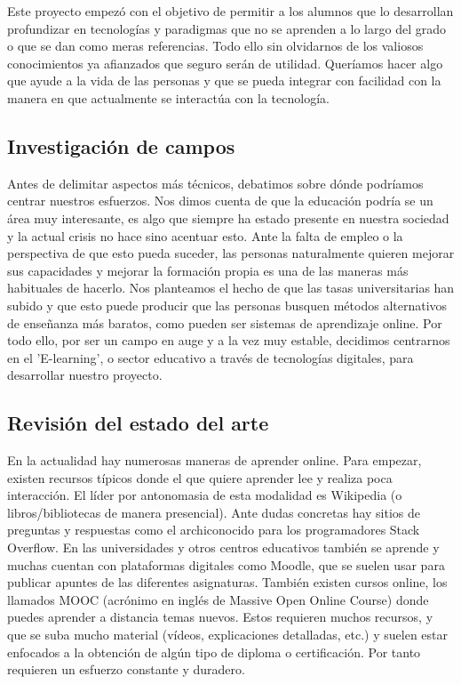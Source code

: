 
Este proyecto empezó con el objetivo de permitir a los alumnos que lo desarrollan profundizar en tecnologías y paradigmas que no se aprenden a lo largo del grado o que se dan como meras referencias. Todo ello sin olvidarnos de los valiosos conocimientos ya afianzados que seguro serán de utilidad. Queríamos hacer algo que ayude a la vida de las personas y que se pueda integrar con facilidad con la manera en que actualmente se interactúa con la tecnología.

\subsection{Investigación de campos\label{subsec:introduction}}

Antes de delimitar aspectos más técnicos, debatimos sobre dónde podríamos centrar nuestros esfuerzos. Nos dimos cuenta de que la educación podría se un área muy interesante, es algo que siempre ha estado presente en nuestra sociedad y la actual crisis no hace sino acentuar esto. Ante la falta de empleo o la perspectiva de que esto pueda suceder, las personas naturalmente quieren mejorar sus capacidades y mejorar la formación propia es una de las maneras más habituales de hacerlo. Nos planteamos el hecho de que las tasas universitarias han subido y que esto puede producir que las personas busquen métodos alternativos de enseñanza más baratos, como pueden ser sistemas de aprendizaje online. Por todo ello, por ser un campo en auge y a la vez muy estable, decidimos centrarnos en el 'E-learning', o sector educativo a través de tecnologías digitales, para desarrollar nuestro proyecto.

\subsection{Revisión del estado del arte\label{subsec:introduction}}

En la actualidad hay numerosas maneras de aprender online. Para empezar, existen recursos típicos donde el que quiere aprender lee y realiza poca interacción. El líder por antonomasia de esta modalidad es Wikipedia\cite{wiki} (o libros/bibliotecas de manera presencial). Ante dudas concretas hay sitios de preguntas y respuestas como el archiconocido para los programadores Stack Overflow\cite{stack}. En las universidades y otros centros educativos también se aprende y  muchas cuentan con plataformas digitales como Moodle\cite{moodle}, que se suelen usar para publicar apuntes de las diferentes asignaturas. También existen cursos online, los llamados MOOC (acrónimo en inglés de Massive Open Online Course) donde puedes aprender a distancia temas nuevos. Estos requieren muchos recursos, y que se suba mucho material (vídeos, explicaciones detalladas, etc.) y suelen estar enfocados a la obtención de algún tipo de diploma o certificación. Por tanto requieren un esfuerzo constante y duradero. 
\vspace{1em}

